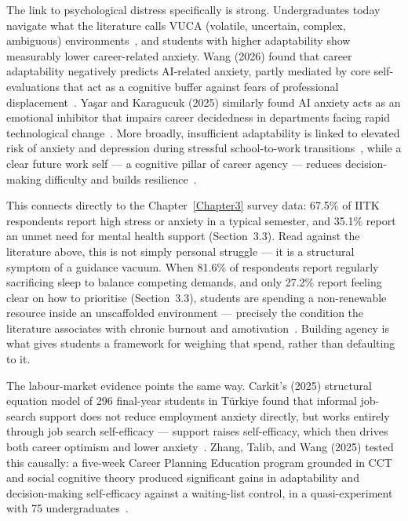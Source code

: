 The link to psychological distress specifically is strong. Undergraduates today navigate what the literature calls VUCA (volatile, uncertain, complex, ambiguous) environments~\cite{Low-2026}, and students with higher adaptability show measurably lower career-related anxiety. Wang (2026) found that career adaptability negatively predicts AI-related anxiety, partly mediated by core self-evaluations that act as a cognitive buffer against fears of professional displacement~\cite{Wang-2026-AI}. Ya\c{s}ar and Karagucuk (2025) similarly found AI anxiety acts as an emotional inhibitor that impairs career decidedness in departments facing rapid technological change~\cite{Yasar-2025}. More broadly, insufficient adaptability is linked to elevated risk of anxiety and depression during stressful school-to-work transitions~\cite{Low-2026, Zhang-2025}, while a clear future work self --- a cognitive pillar of career agency --- reduces decision-making difficulty and builds resilience~\cite{Taber-2015}.

This connects directly to the Chapter~\ref{Chapter3} survey data: 67.5\% of IITK respondents report high stress or anxiety in a typical semester, and 35.1\% report an unmet need for mental health support (Section~3.3). Read against the literature above, this is not simply personal struggle --- it is a structural symptom of a guidance vacuum. When 81.6\% of respondents report regularly sacrificing sleep to balance competing demands, and only 27.2\% report feeling clear on how to prioritise (Section~3.3), students are spending a non-renewable resource inside an unscaffolded environment --- precisely the condition the literature associates with chronic burnout and amotivation~\cite{Maji-2024}. Building agency is what gives students a framework for weighing that spend, rather than defaulting to it.

The labour-market evidence points the same way. Carkit's (2025) structural equation model of 296 final-year students in T\"{u}rkiye found that informal job-search support does not reduce employment anxiety directly, but works entirely through job search self-efficacy --- support raises self-efficacy, which then drives both career optimism and lower anxiety~\cite{Carkit-2025}. Zhang, Talib, and Wang (2025) tested this causally: a five-week Career Planning Education program grounded in CCT and social cognitive theory produced significant gains in adaptability and decision-making self-efficacy against a waiting-list control, in a quasi-experiment with 75 undergraduates~\cite{Zhang-2025}.

